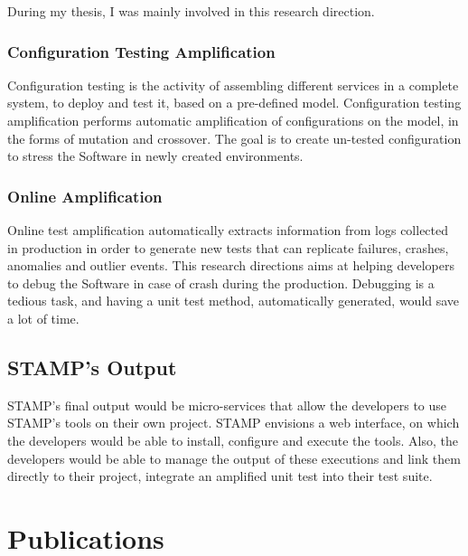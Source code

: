 During my thesis, I was mainly involved in this research direction.

\subsubsection{Configuration Testing Amplification}
\label{subsubsec:intro:research-directions:config-ampl}

Configuration testing is the activity of assembling different services in a complete system, to deploy and test it, based on a pre-defined model.
Configuration testing amplification performs automatic amplification of configurations on the model, in the forms of mutation and crossover.
The goal is to create un-tested configuration to stress the Software in newly created environments.

\subsubsection{Online Amplification}
\label{subsubsec:intro:research-directions:online-ampl}

Online test amplification automatically extracts information from logs collected in production in order to generate new tests that can replicate failures, crashes, anomalies and outlier events.
This research directions aims at helping developers to debug the Software in case of crash during the production.
Debugging is a tedious task, and having a unit test method, automatically generated, would save a lot of time.

\subsection{STAMP's Output}

STAMP's final output would be micro-services that allow the developers to use STAMP's tools on their own project.
STAMP envisions a web interface, on which the developers would be able to install, configure and execute the tools.
Also, the developers would be able to manage the output of these executions and link them directly to their project, \eg integrate an amplified unit test into their test suite.

\section{Publications}
\label{sec:intro:publications}


